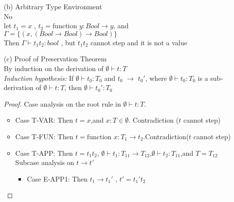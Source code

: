 \documentclass{article}
\begin{document}
\begin{description}
\begin{enumerate}
\begin{proof}
\begin{itemize}
\begin{itemize}
                                        Then $t \rightarrow t' = v_1 t_2'$ by E-APP2
                                    \item Case Both $t_1$ and $t_2$ are values\\
                                        Then, $t \rightarrow t' = [x \rightarrow v_2]t_{12}$ by E-APPBETA
                                \end{itemize}
                        \end{itemize}
                    \end{proof}
                \item[(b)]{Arbitrary Type Environment}\\No\\ let $t_1 = x$ , $t_2 = \text{function \ } y:Bool \rightarrow  y $, and $\Gamma = \{(x,(Bool \rightarrow Bool) \rightarrow Bool)\}$\\
                   Then $\Gamma \vdash t_1 t_2: bool$ , but $t_1 t_2$ cannot step and it is not a value
                \item[(c)]{Proof of Preservation Theorem}\\
                    By induction on the derivation of $\emptyset \vdash t:T$\\
                    \textit{Induction hypothesis:} If $\emptyset \vdash t_0:T_0$ and $t_0$ $\rightarrow$ $t_0'$, where $\emptyset \vdash t_0:T_0$ is a sub-derivation of $\emptyset \vdash t:T$, then $\emptyset \vdash t_0':T_0$
                    \begin{proof}
                        Case analysis on the root rule in $\emptyset \vdash t:T$.
                        \begin{itemize}
                            \item Case T-VAR: Then $t = x$,and $x:T \in \emptyset$. Contradiction ($t$ cannot step)
                            \item Case T-FUN: Then $t = \text{function\ } x:T_1 \rightarrow t_2 $.Contradiction($t$ cannot step)
                            \item Case T-APP: Then $t = t_1 t_2$, $\emptyset \vdash t_1: T_{11} \rightarrow T_{12}$,\space  $\emptyset \vdash t_2:T_{11}$,\space and $T=T_{12}$\\
                            Subcase analysis on $t \rightarrow t'$
                            \begin{itemize}
                                \item Case E-APP1: Then $t_1 \rightarrow t_1'$ , $t' = t_1't_2$\\

\end{itemize}
\end{itemize}
\end{proof}
\end{enumerate}
\end{description}
\end{document}
